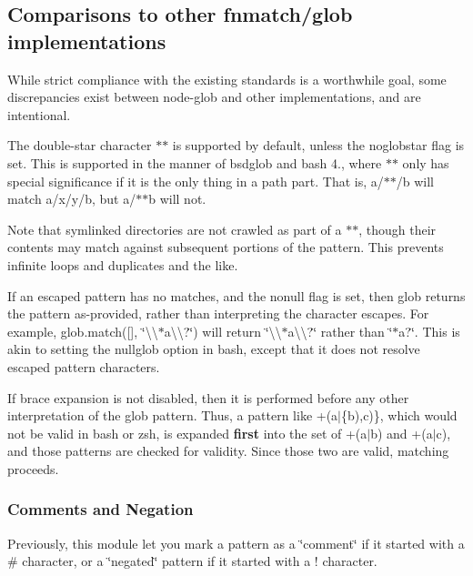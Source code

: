 \subsection*{Comparisons to other fnmatch/glob implementations}

While strict compliance with the existing standards is a worthwhile goal, some discrepancies exist between node-\/glob and other implementations, and are intentional.

The double-\/star character {\ttfamily $\ast$$\ast$} is supported by default, unless the {\ttfamily noglobstar} flag is set. This is supported in the manner of bsdglob and bash 4., where {\ttfamily $\ast$$\ast$} only has special significance if it is the only thing in a path part. That is, {\ttfamily a/$\ast$$\ast$/b} will match {\ttfamily a/x/y/b}, but {\ttfamily a/$\ast$$\ast$b} will not.

Note that symlinked directories are not crawled as part of a {\ttfamily $\ast$$\ast$}, though their contents may match against subsequent portions of the pattern. This prevents infinite loops and duplicates and the like.

If an escaped pattern has no matches, and the {\ttfamily nonull} flag is set, then glob returns the pattern as-\/provided, rather than interpreting the character escapes. For example, {\ttfamily glob.\+match(\mbox{[}\mbox{]}, \char`\"{}\textbackslash{}\textbackslash{}$\ast$a\textbackslash{}\textbackslash{}?\char`\"{})} will return {\ttfamily \char`\"{}\textbackslash{}\textbackslash{}$\ast$a\textbackslash{}\textbackslash{}?\char`\"{}} rather than {\ttfamily \char`\"{}$\ast$a?\char`\"{}}. This is akin to setting the {\ttfamily nullglob} option in bash, except that it does not resolve escaped pattern characters.

If brace expansion is not disabled, then it is performed before any other interpretation of the glob pattern. Thus, a pattern like {\ttfamily +(a$\vert$\{b),c)\}}, which would not be valid in bash or zsh, is expanded {\bfseries first} into the set of {\ttfamily +(a$\vert$b)} and {\ttfamily +(a$\vert$c)}, and those patterns are checked for validity. Since those two are valid, matching proceeds.

\subsubsection*{Comments and Negation}

Previously, this module let you mark a pattern as a \char`\"{}comment\char`\"{} if it started with a {\ttfamily \#} character, or a \char`\"{}negated\char`\"{} pattern if it started with a {\ttfamily !} character.


